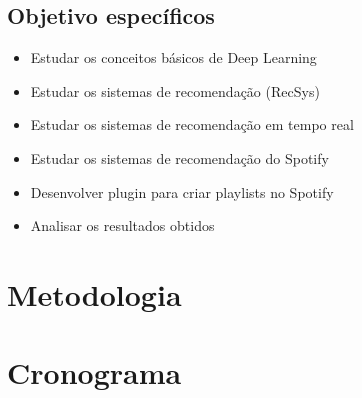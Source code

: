 \documentclass{article}
\begin{document}
\subsection{Objetivo específicos}

\begin{itemize}
\item Estudar os conceitos básicos de Deep Learning
\item Estudar os sistemas de recomendação (RecSys)
\item Estudar os sistemas de recomendação em tempo real
\item Estudar os sistemas de recomendação do Spotify
\item Desenvolver plugin para criar playlists no Spotify
\item Analisar os resultados obtidos
\end{itemize}

\newpage

\section{Metodologia}

\newpage

\section{Cronograma}

\newpage

% 


\end{document}

